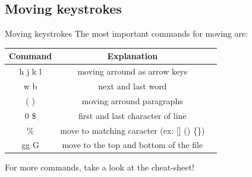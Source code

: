 \documentclass{beamer}
\begin{document}
\subsection{Moving keystrokes}
\begin{frame}{Moving keystrokes}
  The most important commands for moving are:
  \begin{center}
    \begin{tabular}{ |c|c|c| } 
      \hline
      Command & Explanation \\ \hline
      h j k l & moving arround as arrow keys \\ \hline
      w b & next and last word  \\ \hline
      ( ) & moving arround paragraphs \\ \hline
      0 \$ & first and last character of line \\ \hline
      \% & move to matching caracter (ex: [] () \{\}) \\ \hline
      gg G & move to the top and bottom of the file \\ \hline
    \end{tabular}
  \end{center}

  For more commands, take a look at the cheat-sheet!
\end{frame}
\end{document}
